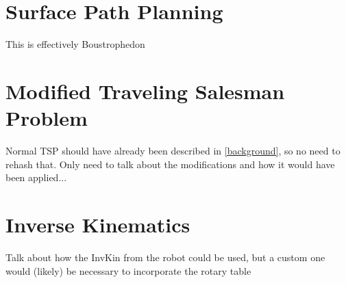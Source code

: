 \section{Surface Path Planning}
This is effectively Boustrophedon

\section{Modified Traveling Salesman Problem}
Normal TSP should have already been described in \ref{background}, so no need to rehash that.
Only need to talk about the modifications and how it would have been applied...

\section{Inverse Kinematics}
Talk about how the InvKin from the robot could be used, but a custom one would (likely) be necessary to incorporate the rotary table

